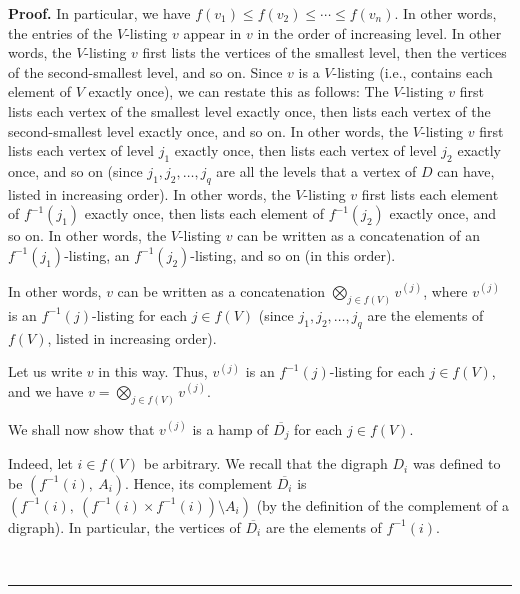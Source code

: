 \documentclass[numbers=enddot,12pt,final,onecolumn,notitlepage]{scrartcl}%
\numberwithin{exer}{section}
\theoremstyle{definition}
\newenvironment{proof}[1][Proof]{\noindent\textbf{#1.} }{\ \rule{0.5em}{0.5em}}
\newenvironment{verlong}{}{}
\begin{document}
\begin{verlong}
\begin{proof}
In particular, we have $f\left(  v_{1}\right)  \leq f\left(  v_{2}\right)
\leq\cdots\leq f\left(  v_{n}\right)  $. In other words, the entries of the
$V$-listing $v$ appear in $v$ in the order of increasing level. In other
words, the $V$-listing $v$ first lists the vertices of the smallest level,
then the vertices of the second-smallest level, and so on. Since $v$ is a
$V$-listing (i.e., contains each element of $V$ exactly once), we can restate
this as follows: The $V$-listing $v$ first lists each vertex of the smallest
level exactly once, then lists each vertex of the second-smallest level
exactly once, and so on. In other words, the $V$-listing $v$ first lists each
vertex of level $j_{1}$ exactly once, then lists each vertex of level $j_{2}$
exactly once, and so on (since $j_{1},j_{2},\ldots,j_{q}$ are all the levels
that a vertex of $D$ can have, listed in increasing order). In other words,
the $V$-listing $v$ first lists each element of $f^{-1}\left(  j_{1}\right)  $
exactly once, then lists each element of $f^{-1}\left(  j_{2}\right)  $
exactly once, and so on. In other words, the $V$-listing $v$ can be written as
a concatenation of an $f^{-1}\left(  j_{1}\right)  $-listing, an
$f^{-1}\left(  j_{2}\right)  $-listing, and so on (in this order).

In other words, $v$ can be written as a concatenation $\bigotimes\limits_{j\in
f\left(  V\right)  }v^{\left(  j\right)  }$, where $v^{\left(  j\right)  }$ is
an $f^{-1}\left(  j\right)  $-listing for each $j\in f\left(  V\right)  $
(since $j_{1},j_{2},\ldots,j_{q}$ are the elements of $f\left(  V\right)  $,
listed in increasing order).

Let us write $v$ in this way. Thus, $v^{\left(  j\right)  }$ is an
$f^{-1}\left(  j\right)  $-listing for each $j\in f\left(  V\right)  $, and we
have $v=\bigotimes\limits_{j\in f\left(  V\right)  }v^{\left(  j\right)  }$.

We shall now show that $v^{\left(  j\right)  }$ is a hamp of $\overline{D_{j}%
}$ for each $j\in f\left(  V\right)  $.

Indeed, let $i\in f\left(  V\right)  $ be arbitrary. We recall that the
digraph $D_{i}$ was defined to be $\left(  f^{-1}\left(  i\right)
,\ A_{i}\right)  $. Hence, its complement $\overline{D_{i}}$ is $\left(
f^{-1}\left(  i\right)  ,\ \left(  f^{-1}\left(  i\right)  \times
f^{-1}\left(  i\right)  \right)  \setminus A_{i}\right)  $ (by the definition
of the complement of a digraph). In particular, the vertices of $\overline
{D_{i}}$ are the elements of $f^{-1}\left(  i\right)  $.


\end{proof}
\end{verlong}
\end{document}
